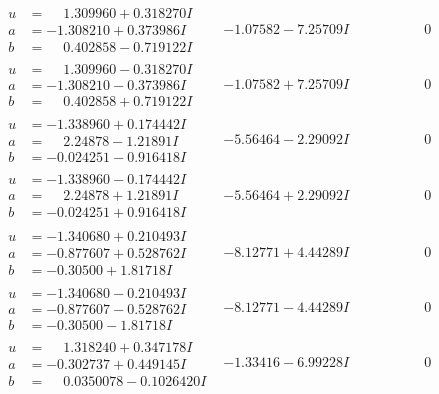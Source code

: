 \documentclass[1p]{elsarticle_modified}
\theoremstyle{definition}
\begin{document}
$$\begin{array}{c|c|c}
\begin{aligned}
u &= \phantom{-}1.309960 + 0.318270 I \\
a &= -1.308210 + 0.373986 I \\
b &= \phantom{-}0.402858 - 0.719122 I\end{aligned}
 & -1.07582 - 7.25709 I & \phantom{-0.000000 } 0 \\ \hline\begin{aligned}
u &= \phantom{-}1.309960 - 0.318270 I \\
a &= -1.308210 - 0.373986 I \\
b &= \phantom{-}0.402858 + 0.719122 I\end{aligned}
 & -1.07582 + 7.25709 I & \phantom{-0.000000 } 0 \\ \hline\begin{aligned}
u &= -1.338960 + 0.174442 I \\
a &= \phantom{-}2.24878 - 1.21891 I \\
b &= -0.024251 - 0.916418 I\end{aligned}
 & -5.56464 - 2.29092 I & \phantom{-0.000000 } 0 \\ \hline\begin{aligned}
u &= -1.338960 - 0.174442 I \\
a &= \phantom{-}2.24878 + 1.21891 I \\
b &= -0.024251 + 0.916418 I\end{aligned}
 & -5.56464 + 2.29092 I & \phantom{-0.000000 } 0 \\ \hline\begin{aligned}
u &= -1.340680 + 0.210493 I \\
a &= -0.877607 + 0.528762 I \\
b &= -0.30500 + 1.81718 I\end{aligned}
 & -8.12771 + 4.44289 I & \phantom{-0.000000 } 0 \\ \hline\begin{aligned}
u &= -1.340680 - 0.210493 I \\
a &= -0.877607 - 0.528762 I \\
b &= -0.30500 - 1.81718 I\end{aligned}
 & -8.12771 - 4.44289 I & \phantom{-0.000000 } 0 \\ \hline\begin{aligned}
u &= \phantom{-}1.318240 + 0.347178 I \\
a &= -0.302737 + 0.449145 I \\
b &= \phantom{-}0.0350078 - 0.1026420 I\end{aligned}
 & -1.33416 - 6.99228 I & \phantom{-0.000000 } 0 \\ \hline\begin{aligned}

\end{aligned}
\end{array}$$
\end{document}
